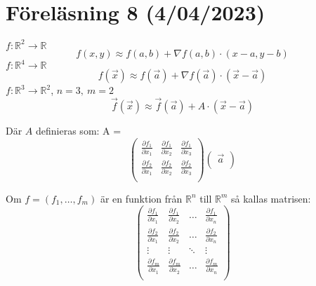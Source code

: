 \documentclass{report}
\begin{document}
\section{Föreläsning 8 (4/04/2023)}

{
$ f : \mathbb{R}^2 \to \mathbb{R} $
\begin{equation*}
f(x,y) \approx f(a,b) + \nabla f (a,b) \cdot (x-a,y-b)
\end{equation*}
$ f : \mathbb{R}^4 \to \mathbb{R} $
\begin{equation*}
f( \vec{x} ) \approx f( \vec{a} ) + \nabla f( \vec{a} ) \cdot ( \vec{x} - \vec{a} )
\end{equation*}
$ f : \mathbb{R}^3 \to \mathbb{R}^2 $, $  n = 3, \: m =2 $
\begin{equation*}
\vec{f} ( \vec{x} ) \approx \vec{f} ( \vec{a} ) + A \cdot ( \vec{x} - \vec{a} )
\end{equation*}

Där $ A $ definieras som:
A =
\begin{equation*}
\begin{pmatrix}
	\frac{\partial f_1 }{\partial x_1 }  & \frac{\partial f_1 }{\partial x_2 }  & \frac{\partial f_1 }{\partial x_3 }  \\
	\frac{\partial f_2 }{\partial x_1 }  & \frac{\partial f_2 }{\partial x_2 }  & \frac{\partial f_2 }{\partial x_3 }  \\
\end{pmatrix}
\begin{pmatrix}
	\vec{a}  \\
\end{pmatrix}
\end{equation*}

}

{
Om $ f = (f_1, \ldots , f_m) $ är en funktion från $ \mathbb{R}^n $ till $ \mathbb{R}^m $ så kallas matrisen:
\begin{equation*}
\begin{pmatrix}
	\frac{\partial f_1 }{\partial x_1 }  & \frac{\partial f_1 }{\partial x_2 }  & \ldots  & \frac{\partial f_1 }{\partial x_n }  \\
	\frac{\partial f_2 }{\partial x_1 }  & \frac{\partial f_2 }{\partial x_2 }  & \ldots  & \frac{\partial f_2 }{\partial x_n }  \\
	\vdots & \vdots & \ddots & \vdots \\
	\frac{\partial f_m }{\partial x_1 }  & \frac{\partial f_m }{\partial x_2 }  & \ldots  & \frac{\partial f_m }{\partial x_n }  \\
\end{pmatrix}
\end{equation*}
}
\end{document}

